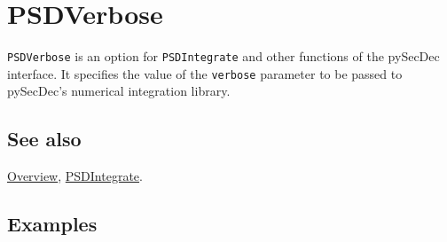 \documentclass[../FeynHelpersManual.tex]{subfiles}
\begin{document}
\hypertarget{psdverbose}{
\section{PSDVerbose}\label{psdverbose}}

\texttt{PSDVerbose} is an option for \texttt{PSDIntegrate} and other
functions of the pySecDec interface. It specifies the value of the
\texttt{verbose} parameter to be passed to pySecDec's numerical
integration library.

\subsection{See also}

\hyperlink{toc}{Overview}, \hyperlink{psdintegrate}{PSDIntegrate}.

\subsection{Examples}
\end{document}
